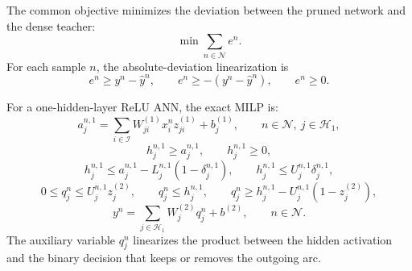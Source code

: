 The common objective minimizes the deviation between the pruned network and the dense teacher:
\begin{equation}
    \min \sum_{n\in\mathcal{N}} e^n.
    \label{eq:pruning_milp_objective}
\end{equation}
For each sample $n$, the absolute-deviation linearization is
\begin{equation}
    e^n \ge y^n - \hat{y}^n, \qquad
    e^n \ge -\left(y^n - \hat{y}^n\right), \qquad
    e^n \ge 0.
    \label{eq:pruning_milp_abs}
\end{equation}

For a one-hidden-layer ReLU ANN, the exact MILP is:
\begin{equation}
    a_{j}^{n,1} = \sum_{i\in\mathcal{I}} W_{ji}^{(1)} x_i^n z_{ji}^{(1)} + b_j^{(1)},
    \qquad n\in\mathcal{N},\ j\in\mathcal{H}_1,
    \label{eq:pruning_one_layer_affine}
\end{equation}
\begin{equation}
    h_{j}^{n,1} \ge a_{j}^{n,1}, \qquad
    h_{j}^{n,1} \ge 0,
    \label{eq:pruning_one_layer_relu_lower}
\end{equation}
\begin{equation}
    h_{j}^{n,1} \le a_{j}^{n,1} - L_{j}^{n,1}\left(1-\delta_{j}^{n,1}\right), \qquad
    h_{j}^{n,1} \le U_{j}^{n,1}\delta_{j}^{n,1},
    \label{eq:pruning_one_layer_relu_upper}
\end{equation}
\begin{equation}
    0 \le q_j^n \le U_{j}^{n,1} z_j^{(2)}, \qquad
    q_j^n \le h_{j}^{n,1}, \qquad
    q_j^n \ge h_{j}^{n,1} - U_{j}^{n,1}\left(1-z_j^{(2)}\right),
    \label{eq:pruning_one_layer_product}
\end{equation}
\begin{equation}
    y^n = \sum_{j\in\mathcal{H}_1} W_{j}^{(2)} q_j^n + b^{(2)},
    \qquad n\in\mathcal{N}.
    \label{eq:pruning_one_layer_output}
\end{equation}
The auxiliary variable $q_j^n$ linearizes the product between the hidden activation and the binary decision that keeps or removes the outgoing arc.

